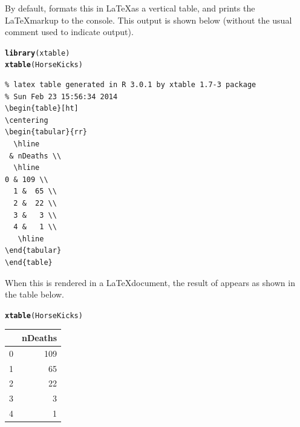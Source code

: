 \documentclass[11pt]{book}\usepackage[]{graphicx}\usepackage[]{color}
\makeatletter
\newcommand{\hlstd}[1]{\textcolor[rgb]{0.345,0.345,0.345}{#1}}%
\newcommand{\hlkwd}[1]{\textcolor[rgb]{0.737,0.353,0.396}{\textbf{#1}}}%
\newenvironment{kframe}{%
 \def\at@end@of@kframe{}%
 \ifinner\ifhmode%
  \def\at@end@of@kframe{\end{minipage}}%
  \begin{minipage}{\columnwidth}%
 \fi\fi%
 \def\FrameCommand##1{\hskip\@totalleftmargin \hskip-\fboxsep
 \colorbox{shadecolor}{##1}\hskip-\fboxsep
     \hskip-\linewidth \hskip-\@totalleftmargin \hskip\columnwidth}%
 \MakeFramed {\advance\hsize-\width
   \@totalleftmargin\z@ \linewidth\hsize
   \@setminipage}}%
 {\par\unskip\endMakeFramed%
 \at@end@of@kframe}
\newenvironment{knitrout}{}{} %
\renewenvironment{knitrout}{\small\renewcommand{\baselinestretch}{.85}}{} %
\makeatother
\begin{document}
By default,  formats this in \LaTeX as a vertical table,
and prints the \LaTeX markup to the \R console.  This output is shown
below (without the usual \code{\#\#} comment used to indicate \R output).
\begin{knitrout}
\color{fgcolor}\begin{kframe}
\begin{alltt}
\hlkwd{library}\hlstd{(xtable)}
\hlkwd{xtable}\hlstd{(HorseKicks)}
\end{alltt}
\begin{verbatim}
% latex table generated in R 3.0.1 by xtable 1.7-3 package
% Sun Feb 23 15:56:34 2014
\begin{table}[ht]
\centering
\begin{tabular}{rr}
  \hline
 & nDeaths \\ 
  \hline
0 & 109 \\ 
  1 &  65 \\ 
  2 &  22 \\ 
  3 &   3 \\ 
  4 &   1 \\ 
   \hline
\end{tabular}
\end{table}
\end{verbatim}
\end{kframe}
\end{knitrout}

When this is rendered in a \LaTeX document, the result of 
appears as shown in the table below.
\begin{kframe}
\begin{alltt}
\hlkwd{xtable}\hlstd{(HorseKicks)}
\end{alltt}
\end{kframe}%
\begin{table}[ht]
\centering
\begin{tabular}{rr}
  \hline
 & nDeaths \\ 
  \hline
0 & 109 \\ 
  1 &  65 \\ 
  2 &  22 \\ 
  3 &   3 \\ 
  4 &   1 \\ 
   \hline
\end{tabular}
\end{table}
\end{document}
